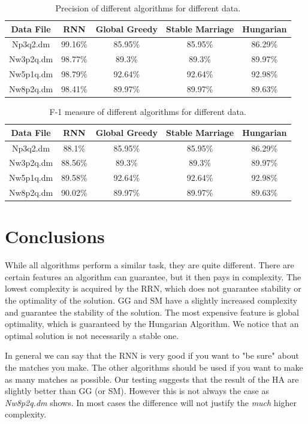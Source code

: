 \documentclass[a4paper,11pt]{article}
\begin{document}
\begin{table}[tbh]
\centering
\begin{tabular}{|c|c|c|c|c|}
\hline 
Data File & RNN & Global Greedy & Stable Marriage & Hungarian \tabularnewline
\hline 
\hline 
 Np3q2.dm & 99.16\% & 85.95\% & 85.95\% & 86.29\%\tabularnewline
\hline
 Nw3p2q.dm & 98.77\% & 89.3\% & 89.3\% & 89.97\%\tabularnewline
\hline 
 Nw5p1q.dm & 98.79\% & 92.64\% & 92.64\% & 92.98\%\tabularnewline
\hline 
 Nw8p2q.dm & 98.41\% & 89.97\% & 89.97\% & 89.63\%\tabularnewline
\hline
\end{tabular}
\caption{Precision of different algorithms for different data.}
\label{precision}
\end{table}

\begin{table}[tbh]
\centering
\begin{tabular}{|c|c|c|c|c|}
\hline 
Data File & RNN & Global Greedy & Stable Marriage & Hungarian \tabularnewline
\hline 
\hline 
 Np3q2.dm & 88.1\% & 85.95\% & 85.95\% & 86.29\%\tabularnewline
\hline
 Nw3p2q.dm & 88.56\% & 89.3\% & 89.3\% & 89.97\%\tabularnewline
\hline 
 Nw5p1q.dm & 89.58\% & 92.64\% & 92.64\% & 92.98\%\tabularnewline
\hline 
 Nw8p2q.dm & 90.02\% & 89.97\% & 89.97\% & 89.63\%\tabularnewline
\hline
\end{tabular}
\caption{F-1 measure of different algorithms for different data.}
\label{fmeasure}
\end{table}

\section{Conclusions}

While all algorithms perform a similar task, they are quite different. There are certain features an algorithm can guarantee, but it then pays in complexity. The lowest complexity is acquired by the RRN, which does not guarantee stability or the optimality of the solution. GG and SM have a slightly increased complexity and guarantee the stability of the solution. The most expensive feature is global optimality, which is guaranteed by the Hungarian Algorithm. We notice that an optimal solution is not necessarily a stable one.

In general we can say that the RNN is very good if you want to "be sure" about the matches you make. The other algorithms should be used if you want to make as many matches as possible. Our testing suggests that the result of the HA are slightly better than GG (or SM). However this is not always the case as \textit{Nw8p2q.dm} shows. In most cases the difference will not justify the \textit{much} higher complexity. 
\end{document}
